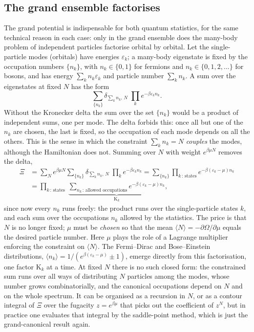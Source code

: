 \documentclass[10pt,a4paper]{article}
\theoremstyle{plain}
\theoremstyle{remark}
\providecommand{\Kappa}{\mathrm{K}}
\begin{document}
\subsection{The grand ensemble factorises}
\label{app:quad_factor}

The grand potential is indispensable for both quantum statistics, for the same
technical reason in each case: only in the grand ensemble does the many-body
problem of independent particles factorise orbital by orbital. Let the single-particle
modes (orbitals) have energies $ \varepsilon_k $; a many-body eigenstate is fixed by
the occupation numbers $ \{n_k\} $, with $ n_k \in \{0, 1\} $ for fermions and
$ n_k \in \{0, 1, 2, \dots\} $ for bosons, and has energy $ \sum_k n_k\varepsilon_k $
and particle number $ \sum_k n_k $. A sum over the eigenstates at fixed $ N $
has the form
\[
  \sum_{\{n_k\}} \delta_{\sum_k n_k,\,N}\; \prod_k e^{-\beta\varepsilon_k n_k} .
\]
Without the Kronecker delta the sum over the set $ \{n_k\} $ would be a product of
independent sums, one per mode. The delta forbids this: once all but one of the
$ n_k $ are chosen, the last is fixed, so the occupation of each mode depends on all
the others. This is the sense in which the constraint $ \sum_kn_k = N $
\emph{couples} the modes, although the Hamiltonian does not. Summing over $ N $
with weight $ e^{\beta\mu N} $ removes the delta,
\[
\begin{aligned}
  \Xi &= \sum_N e^{\beta\mu N}\sum_{\{n_k\}} \delta_{\sum_k n_k,\,N}\; \prod_k e^{-\beta\varepsilon_k n_k}
  = \sum_{\{n_k\}} \prod_{k\,:\,\text{states}} e^{-\beta(\varepsilon_k - \mu)n_k}
  \\
  &= \prod_{k\,:\,\text{states}}\;
    \underbrace{\sum_{n_k\,:\,\text{allowed occupations}} e^{-\beta(\varepsilon_k - \mu)n_k}}_{\Kappa_k} ,
\end{aligned}
\]
since now every $ n_k $ runs freely: the product runs over the single-particle
states $ k $, and each sum over the occupations $ n_k $ allowed by the statistics.
The price is that $ N $ is no longer fixed;
$ \mu $ must be \emph{chosen} so that the mean $ \langle N\rangle =
-\partial\Omega/\partial\mu $ equals the desired particle number. Here $\mu$ plays the
role of a Lagrange multiplier enforcing the constraint on $\langle N\rangle$.
The Fermi--Dirac and Bose--Einstein distributions, $ \langle n_k\rangle =
1/(e^{\beta(\varepsilon_k-\mu)} \pm 1) $, emerge directly from this
factorisation, one factor $ \Kappa_k $ at a time. At fixed $ N $ there is no such
closed form: the constrained sum runs over all ways of distributing $ N $ particles among
the modes, whose number grows combinatorially, and the canonical occupations
depend on $ N $ and on the whole spectrum. It can be organised as a recursion in
$ N $, or as a contour integral of $ \Xi $ over the fugacity $ z = e^{\beta\mu} $
that picks out the coefficient of $ z^{N} $, but in practice one evaluates that
integral by the saddle-point method, which is just the grand-canonical result
again.
\end{document}
